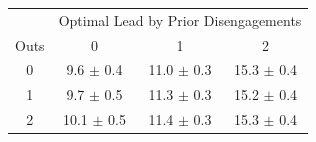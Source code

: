 \begin{tabular}{c|ccc}
& \multicolumn{3}{c}{Optimal Lead by Prior Disengagements}\\
Outs & 0 & 1 & 2 \\
  \hline
  0 & 9.6 {\color{gray} $\pm$ 0.4} & 11.0 {\color{gray} $\pm$ 0.3} & 15.3 {\color{gray} $\pm$ 0.4} \\ 
    1 & 9.7 {\color{gray} $\pm$ 0.5} & 11.3 {\color{gray} $\pm$ 0.3} & 15.2 {\color{gray} $\pm$ 0.4} \\ 
    2 & 10.1 {\color{gray} $\pm$ 0.5} & 11.4 {\color{gray} $\pm$ 0.3} & 15.3 {\color{gray} $\pm$ 0.4} \\ 
\end{tabular}
